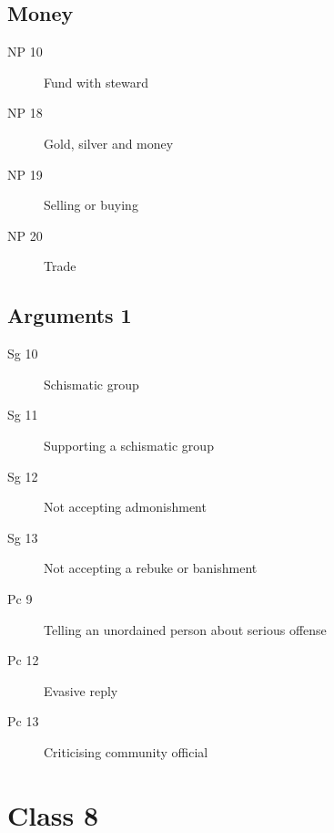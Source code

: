 \documentclass[11pt,oneside]{memoir}
\begin{document}
\begin{multicols}{2}

\section{Money}

\begin{description}
\item[NP 10] Fund with steward
\item[NP 18] Gold, silver and money
\item[NP 19] Selling or buying
\item[NP 20 \orig] Trade%
\end{description}

\columnbreak

\section{Arguments 1}

\begin{description}
\item[Sg 10 \orig] Schismatic group
\item[Sg 11] Supporting a schismatic group
\item[Sg 12] Not accepting admonishment
\item[Sg 13] Not accepting a rebuke or banishment
\item[Pc 9] Telling an unordained person about serious offense
\item[Pc 12] Evasive reply
\item[Pc 13] Criticising community official
\end{description}

\end{multicols}

\chapter{Class 8}
\end{document}
